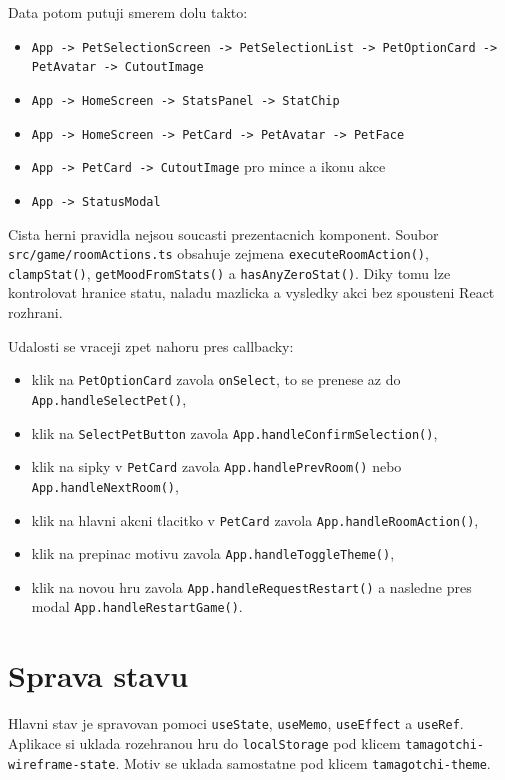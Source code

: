 \documentclass[12pt,a4paper]{article}
\begin{document}
Data potom putuji smerem dolu takto:
\begin{itemize}[leftmargin=2em]
  \item \texttt{App -> PetSelectionScreen -> PetSelectionList -> PetOptionCard -> PetAvatar -> CutoutImage}
  \item \texttt{App -> HomeScreen -> StatsPanel -> StatChip}
  \item \texttt{App -> HomeScreen -> PetCard -> PetAvatar -> PetFace}
  \item \texttt{App -> PetCard -> CutoutImage} pro mince a ikonu akce
  \item \texttt{App -> StatusModal}
\end{itemize}

Cista herni pravidla nejsou soucasti prezentacnich komponent. Soubor \texttt{src/game/roomActions.ts} obsahuje zejmena \texttt{executeRoomAction()}, \texttt{clampStat()}, \texttt{getMoodFromStats()} a \texttt{hasAnyZeroStat()}. Diky tomu lze kontrolovat hranice statu, naladu mazlicka a vysledky akci bez spousteni React rozhrani.

Udalosti se vraceji zpet nahoru pres callbacky:
\begin{itemize}[leftmargin=2em]
  \item klik na \texttt{PetOptionCard} zavola \texttt{onSelect}, to se prenese az do \texttt{App.handleSelectPet()},
  \item klik na \texttt{SelectPetButton} zavola \texttt{App.handleConfirmSelection()},
  \item klik na sipky v \texttt{PetCard} zavola \texttt{App.handlePrevRoom()} nebo \texttt{App.handleNextRoom()},
  \item klik na hlavni akcni tlacitko v \texttt{PetCard} zavola \texttt{App.handleRoomAction()},
  \item klik na prepinac motivu zavola \texttt{App.handleToggleTheme()},
  \item klik na novou hru zavola \texttt{App.handleRequestRestart()} a nasledne pres modal \texttt{App.handleRestartGame()}.
\end{itemize}

\section{Sprava stavu}

Hlavni stav je spravovan pomoci \texttt{useState}, \texttt{useMemo}, \texttt{useEffect} a \texttt{useRef}. Aplikace si uklada rozehranou hru do \texttt{localStorage} pod klicem \texttt{tamagotchi-wireframe-state}. Motiv se uklada samostatne pod klicem \texttt{tamagotchi-theme}.
\end{document}
